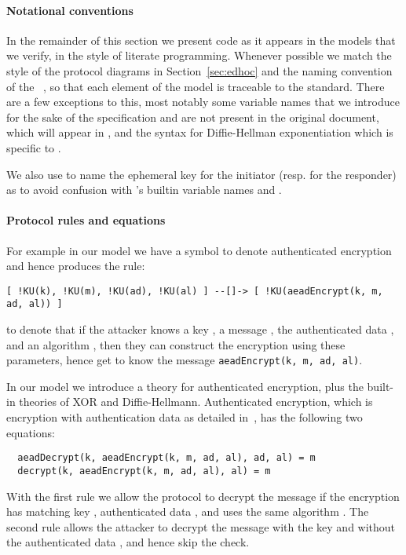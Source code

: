 \paragraph{Notational conventions} In the remainder of this section we present
\mTamarin{} code as it appears in the models that we verify, in the style of
literate programming.  Whenever possible we match the style of the protocol
diagrams in Section~\ref{sec:edhoc} and the naming convention of the \mEdhoc{}
~\cite{selander-lake-edhoc-01}, so that each element of the model is
traceable to the standard.  There are a few exceptions to this, most notably
some variable names that we introduce for the sake of the specification and are
not present in the original document, which will appear in , and
the syntax for Diffie-Hellman exponentiation which is specific to \mTamarin{}.

We also use  to name the ephemeral key for the initiator (resp. 
for the responder) as to avoid confusion with \mTamarin's builtin variable
names  and .

\paragraph{Protocol rules and equations}
For example \vedit{}{,} in our model we have a symbol to denote authenticated encryption and
hence \mTamarin{} produces the rule:
%
\begin{lstlisting}
[ !KU(k), !KU(m), !KU(ad), !KU(al) ] --[]-> [ !KU(aeadEncrypt(k, m, ad, al)) ]
\end{lstlisting}
%
to denote that if the attacker knows a key , a message , the
authenticated data , and an algorithm , then they can construct
the encryption using these parameters, hence get to know the message
\lstinline{aeadEncrypt(k, m, ad, al)}.

In our model we introduce a theory for authenticated encryption, plus the
built-in theories of XOR and Diffie-Hellmann.
%
Authenticated encryption, which is encryption with authentication data as
detailed in~\cite{aead}, has the following two equations:
\begin{lstlisting}
  aeadDecrypt(k, aeadEncrypt(k, m, ad, al), ad, al) = m
  decrypt(k, aeadEncrypt(k, m, ad, al), al) = m
\end{lstlisting}
With the first rule we allow the protocol to decrypt the message  if the
encryption has matching key , authenticated data , and uses the
same algorithm .
%
The second rule allows the attacker to decrypt the message  with the key
 and without the authenticated data , and hence skip the check.

